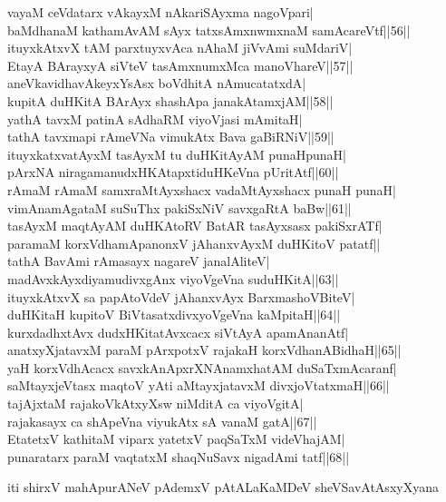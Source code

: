 \documentclass{article}
\begin{document}
vayaM ceVdatarx vAkayxM nAkariSAyxma nagoVpari|\\
baMdhanaM kathamAvAM sAyx tatxsAmxnwmxnaM samAcareVtf||56||\\
ituyxkAtxvX tAM parxtuyxvAca nAhaM jiVvAmi suMdariV|\\
EtayA BArayxyA siVteV tasAmxnumxMca manoVhareV||57||\\
aneVkavidhavAkeyxYsAsx boVdhitA nAmucatatxdA|\\
kupitA duHKitA BArAyx shashApa janakAtamxjAM||58||\\
yathA tavxM patinA sAdhaRM viyoVjasi mAmitaH|\\
tathA tavxmapi rAmeVNa vimukAtx Bava gaBiRNiV||59||\\
ituyxkatxvatAyxM tasAyxM tu duHKitAyAM punaHpunaH|\\
pArxNA niragamanudxHKAtapxtiduHKeVna pUritAtf||60||\\
rAmaM rAmaM samxraMtAyxshacx vadaMtAyxshacx punaH punaH|\\
vimAnamAgataM suSuThx pakiSxNiV savxgaRtA baBw||61||\\
tasAyxM maqtAyAM duHKAtoRV BatAR tasAyxsasx pakiSxrATf|\\
paramaM korxVdhamApanonxV jAhanxvAyxM duHKitoV patatf||\\
tathA BavAmi rAmasayx nagareV janalAliteV|\\
madAvxkAyxdiyamudivxgAnx viyoVgeVna suduHKitA||63||\\
ituyxkAtxvX sa papAtoVdeV jAhanxvAyx BarxmashoVBiteV|\\
duHKitaH kupitoV BiVtasatxdivxyoVgeVna kaMpitaH||64||\\
kurxdadhxtAvx dudxHKitatAvxcacx siVtAyA apamAnanAtf|\\
anatxyXjatavxM paraM pArxpotxV rajakaH korxVdhanABidhaH||65||\\
yaH korxVdhAcacx savxkAnApxrXNAnamxhatAM duSaTxmAcaranf|\\
saMtayxjeVtasx maqtoV yAti aMtayxjatavxM divxjoVtatxmaH||66||\\
tajAjxtaM rajakoVkAtxyXsw niMditA ca viyoVgitA|\\
rajakasayx ca shApeVna viyukAtx sA vanaM gatA||67||\\
EtatetxV kathitaM viparx yatetxV paqSaTxM videVhajAM|\\
punaratarx paraM vaqtatxM shaqNuSavx nigadAmi tatf||68||\\

\begin{center}
iti shirxV mahApurANeV pAdemxV pAtALaKaMDeV sheVSavAtAsxyXyana
\end{center}
\end{document}
